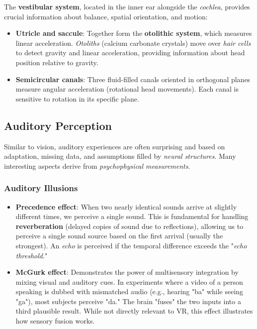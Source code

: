 \documentclass[11pt,a4paper]{article}
\theoremstyle{definition}
\theoremstyle{plain}
\theoremstyle{remark}
\begin{document}
The \textbf{vestibular system}, located in the inner ear alongside the \textit{cochlea}, provides crucial information about balance, spatial orientation, and motion:

\begin{itemize}
    \item \textbf{Utricle and saccule}: Together form the \textbf{otolithic system}, which measures linear acceleration. \textit{Otoliths} (calcium carbonate crystals) move over \textit{hair cells} to detect gravity and linear acceleration, providing information about head position relative to gravity.
    
    \item \textbf{Semicircular canals}: Three fluid-filled canals oriented in orthogonal planes measure angular acceleration (rotational head movements). Each canal is sensitive to rotation in its specific plane.
\end{itemize}

\subsection{Auditory Perception}

Similar to vision, auditory experiences are often surprising and based on adaptation, missing data, and assumptions filled by \textit{neural structures}. Many interesting aspects derive from \textit{psychophysical measurements}.

\subsubsection{Auditory Illusions}

\begin{itemize}
    \item \textbf{Precedence effect}: When two nearly identical sounds arrive at slightly different times, we perceive a single sound. This is fundamental for handling \textbf{reverberation} (delayed copies of sound due to reflections), allowing us to perceive a single sound source based on the first arrival (usually the strongest). An \textit{echo} is perceived if the temporal difference exceeds the "\textit{echo threshold}."
    
    \item \textbf{McGurk effect}: Demonstrates the power of multisensory integration by mixing visual and auditory cues. In experiments where a video of a person speaking is dubbed with mismatched audio (e.g., hearing "ba" while seeing "ga"), most subjects perceive "da." The brain "fuses" the two inputs into a third plausible result. While not directly relevant to VR, this effect illustrates how sensory fusion works.
\end{itemize}
\end{document}
